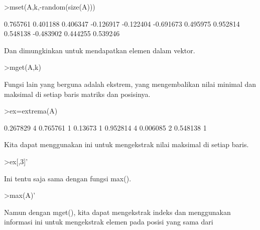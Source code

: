 \documentclass[a4paper,10pt]{article}
\begin{document}
\begin{eulernotebook}
\begin{eulercomment}
\begin{eulercomment}
\begin{eulercomment}
\begin{eulercomment}
\begin{eulercomment}
\begin{eulercomment}
\begin{eulercomment}
\begin{eulercomment}
\begin{eulerprompt}
>mset(A,k,-random(size(A)))
\end{eulerprompt}
\begin{euleroutput}
       0.765761      0.401188      0.406347     -0.126917 
      -0.122404     -0.691673      0.495975      0.952814 
       0.548138     -0.483902      0.444255      0.539246 
\end{euleroutput}
\begin{eulercomment}
Dan dimungkinkan untuk mendapatkan elemen dalam vektor.
\end{eulercomment}
\begin{eulerprompt}
>mget(A,k)
\end{eulerprompt}
\begin{euleroutput}
  [0.267829,  0.13673,  0.390567,  0.006085]
\end{euleroutput}
\begin{eulercomment}
Fungsi lain yang berguna adalah ekstrem, yang mengembalikan nilai
minimal dan maksimal di setiap baris matriks dan posisinya.
\end{eulercomment}
\begin{eulerprompt}
>ex=extrema(A)
\end{eulerprompt}
\begin{euleroutput}
       0.267829             4      0.765761             1 
        0.13673             1      0.952814             4 
       0.006085             2      0.548138             1 
\end{euleroutput}
\begin{eulercomment}
Kita dapat menggunakan ini untuk mengekstrak nilai maksimal di setiap
baris.
\end{eulercomment}
\begin{eulerprompt}
>ex[,3]'
\end{eulerprompt}
\begin{euleroutput}
  [0.765761,  0.952814,  0.548138]
\end{euleroutput}
\begin{eulercomment}
Ini tentu saja sama dengan fungsi max().
\end{eulercomment}
\begin{eulerprompt}
>max(A)'
\end{eulerprompt}
\begin{euleroutput}
  [0.765761,  0.952814,  0.548138]
\end{euleroutput}
\begin{eulercomment}
Namun dengan mget(), kita dapat mengekstrak indeks dan menggunakan
informasi ini untuk mengekstrak elemen pada posisi yang sama dari

\end{eulercomment}
\end{eulercomment}
\end{eulercomment}
\end{eulercomment}
\end{eulercomment}
\end{eulercomment}
\end{eulercomment}
\end{eulercomment}
\end{eulercomment}
\end{eulernotebook}
\end{document}
